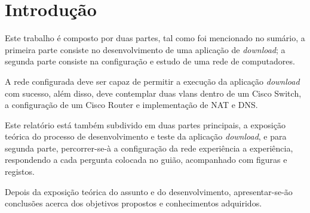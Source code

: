 \section*{Introdução}
Este trabalho é composto por duas partes, tal como foi mencionado no sumário, a primeira parte consiste no desenvolvimento de uma aplicação de \emph{download}; a segunda parte consiste na configuração e estudo de uma rede de computadores.

\noindent A rede configurada deve ser capaz de permitir a execução da aplicação \emph{download} com sucesso, além disso, deve contemplar duas vlans dentro de um Cisco Switch, a configuração de um Cisco Router e implementação de NAT e DNS.

\noindent Este relatório está também subdivido em duas partes principais, a exposição teórica do processo de desenvolvimento e teste da aplicação \emph{download}, e para segunda parte, percorrer-se-à a configuração da rede experiência a experiência, respondendo a cada pergunta colocada no guião, acompanhado com figuras e registos.

\noindent Depois da exposição teórica do assunto e do desenvolvimento, apresentar-se-ão conclusões acerca dos objetivos propostos e conhecimentos adquiridos.